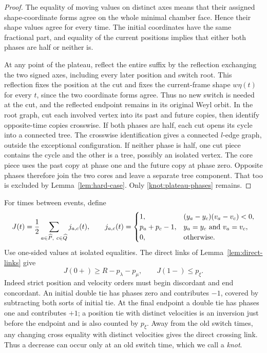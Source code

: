 \begin{proof}
The equality of moving values on distinct axes means that their
assigned shape-coordinate forms agree on the whole minimal chamber
face.  Hence their shape values agree for every time.  The initial
coordinates have the same fractional part, and equality of the current
positions implies that either both phases are half or neither is.

At any point of the plateau, reflect the entire suffix by the
reflection exchanging the two signed axes, including every later
position and switch root.  This reflection fixes the position at the
cut and fixes the current-frame shape \(w\eta(t)\) for every \(t\),
since the two coordinate forms agree.  Thus no new switch is needed
at the cut, and the reflected endpoint remains in its original Weyl
orbit.  In the root graph, cut each involved
vertex into its past and future copies, then identify opposite-time
copies crosswise.  If both phases are half, each cut opens its cycle
into a connected tree.  The crosswise identification gives a connected
\(l\)-edge graph, outside the exceptional configuration.  If neither
phase is half, one cut piece contains the cycle and the other is a
tree, possibly an isolated vertex.  The core piece uses the past copy
at phase one and the future copy at phase zero.  Opposite phases
therefore join the two cores and leave a separate tree component.
That too is excluded by Lemma~\ref{lem:hard-case}.  Only
\eqref{knot:plateau-phases} remains.
\end{proof}

For times between events, define
\begin{equation}\label{knot:J-definition}
 J(t)=\frac12\sum_{a\in\widehat P,\ c\in\widehat Q}j_{a,c}(t),
 \qquad
 j_{a,c}(t)=
 \begin{cases}
  1,&(y_a-y_c)(v_a-v_c)<0,\\
  p_a+p_c-1,&y_a=y_c\ \hbox{and}\ v_a=v_c,\\
  0,&\text{otherwise}.
 \end{cases}
\end{equation}
Use one-sided values at isolated equalities.  The direct links of
Lemma~\ref{lem:direct-links} give
\begin{equation}\label{knot:J-boundaries}
 J(0+)\ge R-p_\lambda-p_\mu,
 \qquad J(1-)\le p_\xi.
\end{equation}
Indeed strict position and velocity orders must begin discordant and
end concordant.  An initial double tie has phases zero and contributes
\(-1\), covered by subtracting both sorts of initial tie.  At the
final endpoint a double tie has phases one and contributes \(+1\);
a position tie with distinct velocities is an inversion just before
the endpoint and is also counted by \(p_\xi\).  Away from the old
switch times, any changing cross equality with distinct velocities
gives the direct crossing link.  Thus a decrease can occur only at an
old switch time, which we call a \emph{knot}.

